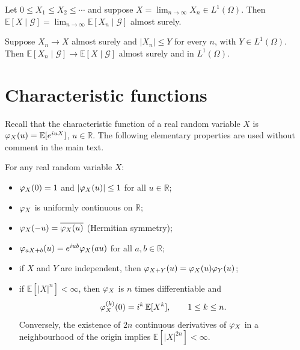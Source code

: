 \begin{proposition}\label{prop:condmct}
Let $0 \leq X_1 \leq X_2 \leq \cdots$ and suppose $X = \lim_{n\to\infty} X_n \in L^1(\Omega)$. Then
$\mathbb{E}[X \mid \mathcal{G}] = \lim_{n \to \infty} \mathbb{E}[X_n \mid \mathcal{G}]$ almost surely.
\qedopentext
\end{proposition}

\begin{proposition}\label{prop:conddct}
Suppose $X_n \to X$ almost surely and $|X_n| \leq Y$ for every $n$, with $Y \in L^1(\Omega)$.
Then $\mathbb{E}[X_n \mid \mathcal{G}] \to \mathbb{E}[X \mid \mathcal{G}]$ almost surely and in $L^1(\Omega)$.
\qedopentext
\end{proposition}

\section{Characteristic functions}\label{app:charfn}

Recall that the characteristic function of a real random variable $X$ is
$\varphi_X(u) = \mathbb{E}[e^{iuX}]$, $u \in \mathbb{R}$. The following elementary
properties are used without comment in the main text.

\begin{proposition}\label{prop:charfnproperties}
For any real random variable $X$:
\begin{itemize}
    \item[i)] $\varphi_X(0) = 1$ and $|\varphi_X(u)| \leq 1$ for all $u \in \mathbb{R}$;
    \item[ii)] $\varphi_X$ is uniformly continuous on $\mathbb{R}$;
    \item[iii)] $\varphi_X(-u) = \overline{\varphi_X(u)}$ (Hermitian symmetry);
    \item[iv)] $\varphi_{aX+b}(u) = e^{iub}\varphi_X(au)$ for all $a,b \in \mathbb{R}$;
    \item[v)] if $X$ and $Y$ are independent, then $\varphi_{X+Y}(u) = \varphi_X(u)\varphi_Y(u)$;
    \item[vi)] if $\mathbb{E}[|X|^n] < \infty$, then $\varphi_X$ is $n$ times differentiable and
    \[
    \varphi_X^{(k)}(0) = i^k\,\mathbb{E}[X^k], \qquad 1 \leq k \leq n.
    \]
    Conversely, the existence of $2n$ continuous derivatives of $\varphi_X$ in a neighbourhood of
    the origin implies $\mathbb{E}[|X|^{2n}] < \infty$.
\end{itemize}
\qedopentext
\end{proposition}

